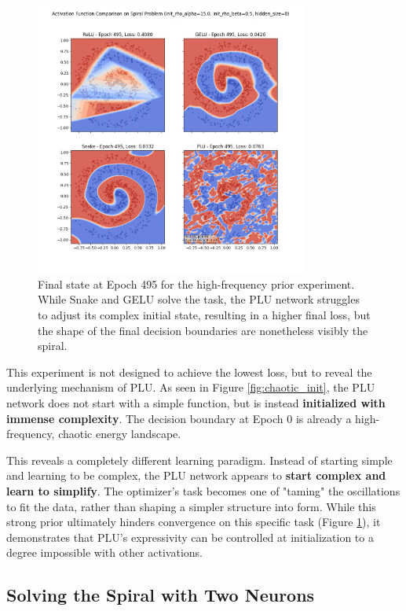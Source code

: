 \documentclass[11pt, letterpaper]{article}
\begin{document}
\begin{figure}[H]
    \centering
    \includegraphics[width=0.8\textwidth]{Examples/spiral_activation_comparison_hidden_neurons_8_sin_pushed_extreme_epoch_495.jpg}
    \caption{Final state at Epoch 495 for the high-frequency prior experiment. While Snake and GELU solve the task, the PLU network struggles to adjust its complex initial state, resulting in a higher final loss, but the shape of the final decision boundaries are nonetheless visibly the spiral.}
    \label{fig:chaotic_final}
\end{figure}

This experiment is not designed to achieve the lowest loss, but to reveal the underlying mechanism of PLU. As seen in Figure \ref{fig:chaotic_init}, the PLU network does not start with a simple function, but is instead \textbf{initialized with immense complexity}. The decision boundary at Epoch 0 is already a high-frequency, chaotic energy landscape.

This reveals a completely different learning paradigm. Instead of starting simple and learning to be complex, the PLU network appears to \textbf{start complex and learn to simplify}. The optimizer's task becomes one of "taming" the oscillations to fit the data, rather than shaping a simpler structure into form. While this strong prior ultimately hinders convergence on this specific task (Figure \ref{fig:chaotic_final}), it demonstrates that PLU's expressivity can be controlled at initialization to a degree impossible with other activations.

\subsection{Solving the Spiral with Two Neurons}
\end{document}
